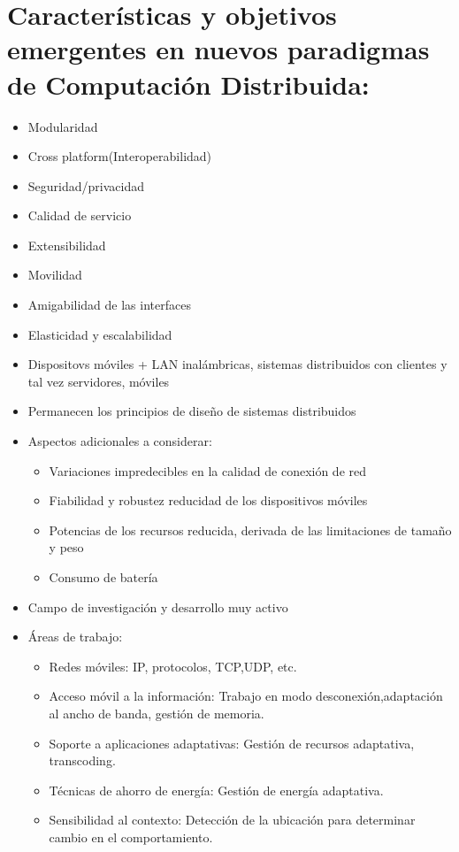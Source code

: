 \section{Características y objetivos emergentes en nuevos paradigmas de Computación Distribuida:}
\begin{itemize}
    \item Modularidad
    \item Cross platform(Interoperabilidad)
    \item Seguridad/privacidad
    \item Calidad de servicio
    \item Extensibilidad
    \item Movilidad
    \item Amigabilidad de las interfaces
    \item Elasticidad y escalabilidad
    \item Dispositovs móviles + LAN inalámbricas, sistemas distribuidos con clientes y tal vez servidores, móviles
    \item Permanecen los principios de diseño de sistemas distribuidos
    \item Aspectos adicionales a considerar:
    \begin{itemize}
        \item Variaciones impredecibles en la calidad de conexión de red
        \item Fiabilidad y robustez reducidad de los dispositivos móviles
        \item Potencias de los recursos reducida, derivada de las limitaciones de tamaño y peso
        \item Consumo de batería
    \end{itemize}
    \item Campo de investigación y desarrollo muy activo
    \item Áreas de trabajo:
    \begin{itemize}
        \item Redes móviles: IP, protocolos, TCP,UDP, etc.
        \item Acceso móvil a la información: Trabajo en modo desconexión,adaptación al ancho de banda, gestión de memoria.
        \item Soporte a aplicaciones adaptativas: Gestión de recursos adaptativa, transcoding.
        \item Técnicas de ahorro de energía: Gestión de energía adaptativa.
        \item Sensibilidad al contexto: Detección de la ubicación para determinar cambio en el comportamiento.

\end{itemize}
\end{itemize}
